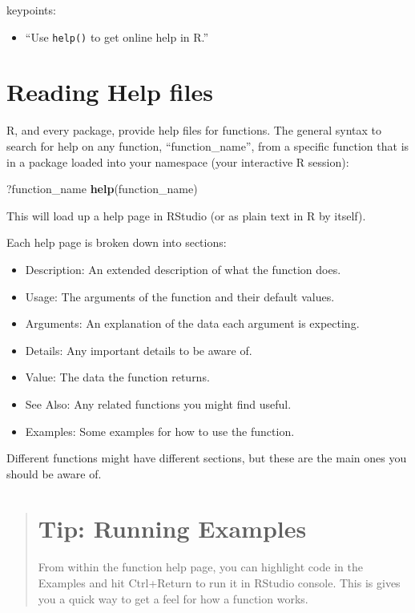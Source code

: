 \documentclass[]{book}
\newenvironment{Shaded}{\begin{snugshade}}{\end{snugshade}}
\newcommand{\KeywordTok}[1]{\textcolor[rgb]{0.13,0.29,0.53}{\textbf{#1}}}
\newcommand{\NormalTok}[1]{#1}
\providecommand{\tightlist}{%
  \setlength{\itemsep}{0pt}\setlength{\parskip}{0pt}}
\begin{document}
keypoints:

\begin{itemize}
\tightlist
\item
  ``Use \texttt{help()} to get online help in R.''
\end{itemize}

\section{Reading Help files}\label{reading-help-files}

R, and every package, provide help files for functions. The general
syntax to search for help on any function, ``function\_name'', from a
specific function that is in a package loaded into your namespace (your
interactive R session):

\begin{Shaded}
\begin{Highlighting}[]
\NormalTok{?function_name}
\KeywordTok{help}\NormalTok{(function_name)}
\end{Highlighting}
\end{Shaded}

This will load up a help page in RStudio (or as plain text in R by
itself).

Each help page is broken down into sections:

\begin{itemize}
\tightlist
\item
  Description: An extended description of what the function does.
\item
  Usage: The arguments of the function and their default values.
\item
  Arguments: An explanation of the data each argument is expecting.
\item
  Details: Any important details to be aware of.
\item
  Value: The data the function returns.
\item
  See Also: Any related functions you might find useful.
\item
  Examples: Some examples for how to use the function.
\end{itemize}

Different functions might have different sections, but these are the
main ones you should be aware of.

\begin{quote}
\section{Tip: Running Examples}\label{tip-running-examples}

From within the function help page, you can highlight code in the
Examples and hit Ctrl+Return to run it in RStudio console. This is gives
you a quick way to get a feel for how a function works.
\end{quote}
\end{document}
